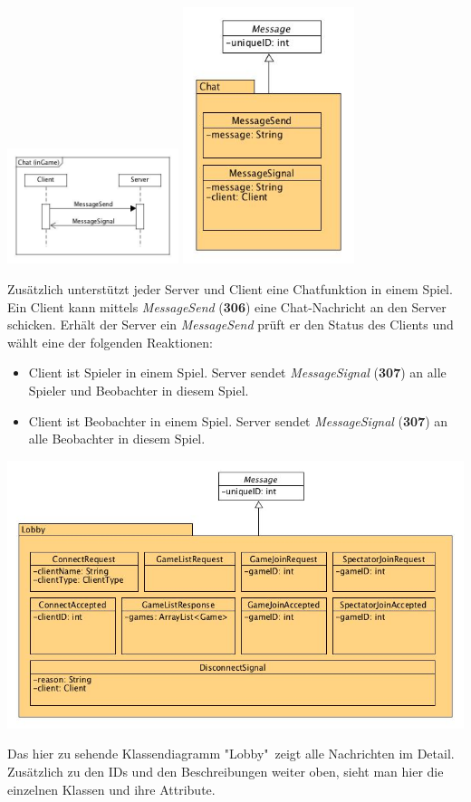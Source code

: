 \documentclass[a4paper, 10pt]{article}
\begin{document}
\newpage
\begin{center}
	\includegraphics[width=5cm]{media/SequenceChat}\hspace{2cm}
	\includegraphics[width=5cm]{media/ClassChat}\\
\end{center}
Zusätzlich unterstützt jeder Server und Client eine Chatfunktion in einem Spiel. Ein Client kann mittels \textit{MessageSend} (\textbf{306}) eine Chat-Nachricht an den Server schicken. Erhält der Server ein \textit{MessageSend} prüft er den Status des Clients und wählt eine der folgenden Reaktionen:
\begin{itemize}
	\item Client ist Spieler in einem Spiel. Server sendet \textit{MessageSignal} (\textbf{307}) an alle Spieler und Beobachter in diesem Spiel.
	\item Client ist Beobachter in einem Spiel. Server sendet \textit{MessageSignal} (\textbf{307}) an alle Beobachter in diesem Spiel.
\end{itemize}

\includegraphics[width=\textwidth]{media/ClassLobby}\par
Das hier zu sehende Klassendiagramm "Lobby"\ zeigt alle Nachrichten im Detail. Zusätzlich zu den IDs und den Beschreibungen weiter oben, sieht man hier die einzelnen Klassen und ihre Attribute.\par
\end{document}
